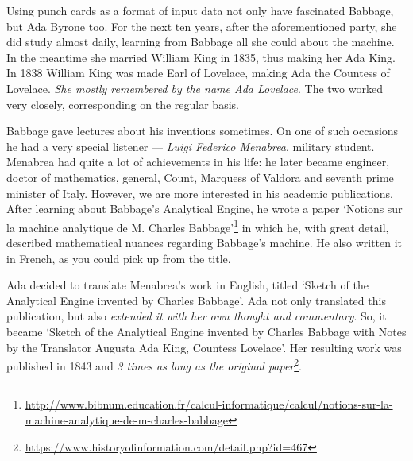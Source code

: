 \documentclass{article}
\begin{document}
            Using punch cards as a format of input data not only have fascinated Babbage, but Ada Byrone too. For the next ten years, after the aforementioned party, she
            did study almost daily, learning from Babbage all she could about the machine. In the meantime she married William King in 1835, thus making her Ada King. In 1838
            William King was made Earl of Lovelace, making Ada the Countess of Lovelace. \emph{She mostly remembered by the name Ada Lovelace}. The two worked very closely,
            corresponding on the regular basis. \par

            Babbage gave lectures about his inventions sometimes. On one of such occasions he had a very special listener --- \emph{Luigi Federico Menabrea}, military student. Menabrea
            had quite a lot of achievements in his life: he later became engineer, doctor of mathematics, general, Count, Marquess of Valdora and seventh prime minister of Italy. 
            However, we are more interested in his academic publications. After learning about Babbage's Analytical Engine, he wrote a paper 
            `Notions sur la machine analytique de M. Charles Babbage'\footnote{\href{http://www.bibnum.education.fr/calcul-informatique/calcul/notions-sur-la-machine-analytique-de-m-charles-babbage}
            {http://www.bibnum.education.fr/calcul-informatique/calcul/notions-sur-la-machine-analytique-de-m-charles-babbage}} in which he, with great detail, described mathematical
            nuances regarding Babbage's machine. He also written it in French, as you could pick up from the title. \par

            Ada decided to translate Menabrea's work in English, titled `Sketch of the Analytical Engine invented by Charles Babbage'. Ada not only translated this publication, but
            also \emph{extended it with her own thought and commentary}. So, it became `Sketch of the Analytical Engine invented by Charles Babbage with Notes by the Translator Augusta Ada King, Countess Lovelace'.
            Her resulting work was published in 1843 and \emph{3 times as long as the original paper}\footnote{\href{https://www.historyofinformation.com/detail.php?id=467}{https://www.historyofinformation.com/detail.php?id=467}}. \par
\end{document}
